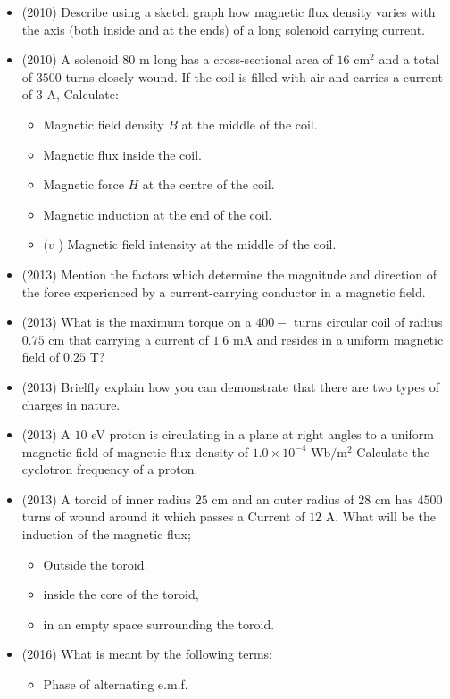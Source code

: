 \documentclass{article}
\begin{document}
\begin{itemize}
\item (2010)  Describe using a sketch graph how magnetic flux density varies with the axis (both inside and at the ends) of a long solenoid carrying current. 
\item (2010)  A solenoid $ 80$ m long has a cross-sectional area of $ 16$ cm$ ^{2}$ and a total of $ 3500$ turns closely wound. If the coil is filled with air and carries a current of $ 3$ A, Calculate:
 \begin{itemize}
\item Magnetic field density $ B$ at the middle of the coil.
\item Magnetic flux inside the coil. 
\item Magnetic force $ H$ at the centre of the coil. 
\item Magnetic induction at the end of the coil.
\item $ (v$ ) Magnetic field intensity at the middle of the coil. 
\end{itemize}
\item (2013)  Mention the factors which determine the magnitude and direction of the force experienced by a current-carrying conductor in a magnetic field.
\item (2013)  What is the maximum torque on a $ 400-$ turns circular coil of radius $ 0.75$ cm that carrying a current of $ 1.6$ mA and resides in a uniform magnetic field of $ 0.25$ T?
\item (2013)  Brielfly explain how you can demonstrate that there are two types of charges in nature.
\item (2013)  A $ 10$ eV proton is circulating in a plane at right angles to a uniform magnetic field of magnetic flux density of $ 1.0 \times 10^{-4}$ Wb$/$m$ ^{2}$ Calculate the cyclotron frequency of a proton.
\item (2013)  A toroid of inner radius $ 25$ cm and an outer radius of $ 28$ cm has $ 4500$ turns of wound around it which passes a Current of $ 12$ A. What will be the induction of the magnetic flux;
 \begin{itemize}
\item Outside the toroid. 
\item inside the core of the toroid, 
\item in an empty space surrounding the toroid. 
\end{itemize}
\item (2016)  What is meant by the following terms:
 \begin{itemize}
\item  Phase of alternating e.m.f.

\end{itemize}
\end{itemize}
\end{document}
